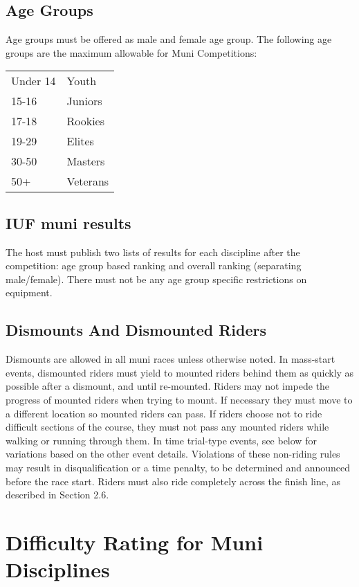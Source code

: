 \subsection{Age Groups}
Age groups must be offered as male and female age group.
The following age groups are the maximum allowable for Muni Competitions:\\
%
\begin{tabular}{ l l}
Under 14 & Youth \\
15-16 & Juniors \\
17-18 & Rookies \\
19-29 & Elites \\
30-50 & Masters \\
50+ & Veterans \\
\end{tabular}


\subsection{IUF muni results}
The host must publish two lists of results for each discipline after the
competition: age group based ranking and overall ranking (separating
male/female). There must not be any age group specific restrictions on
equipment.

\subsection{Dismounts And Dismounted Riders}
Dismounts are allowed in all muni races unless otherwise noted. In mass-start
events, dismounted riders must yield to mounted riders behind them as quickly as
possible after a dismount, and until re-mounted. Riders may not impede the
progress of mounted riders when trying to mount. If necessary they must move to
a different location so mounted riders can pass. If riders choose not to ride
difficult sections of the course, they must not pass any mounted riders while
walking or running through them. In time trial-type events, see below for
variations based on the other event details. Violations of these non-riding
rules may result in disqualification or a time penalty, to be determined and
announced before the race start. Riders must also ride completely across the
finish line, as described in Section 2.6. %

\section{Difficulty Rating for Muni Disciplines}

